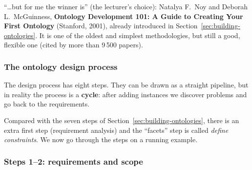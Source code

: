 ``\ldots but for me the winner is'' (the lecturer's choice): Natalya F.\ Noy and
Deborah L.\ McGuinness, \textbf{Ontology Development 101: A Guide to Creating Your First
Ontology} (Stanford, 2001), already introduced in Section~\ref{sec:building-ontologies}.
It is one of the oldest and simplest methodologies, but still a good, flexible one
(cited by more than 9\,500 papers).

\subsubsection{The ontology design process}

The design process has eight steps. They can be drawn as a straight pipeline, but in
reality the process is a \textbf{cycle}: after adding instances we discover problems and
go back to the requirements.

\begin{center}
\label{fig:design-cycle}
\end{center}

Compared with the seven steps of Section~\ref{sec:building-ontologies}, there is an
extra first step (requirement analysis) and the ``facets'' step is called
\emph{define constraints}. We now go through the steps on a running example.

\subsubsection{Steps 1--2: requirements and scope}


